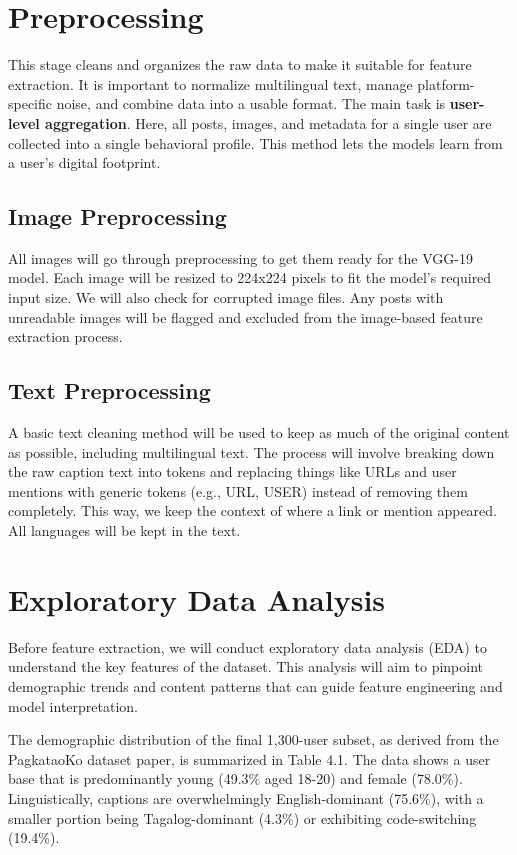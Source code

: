 \section{Preprocessing}
This stage cleans and organizes the raw data to make it suitable for feature extraction. It is important to normalize multilingual text, manage platform-specific noise, and combine data into a usable format. The main task is \textbf{user-level aggregation}. Here, all posts, images, and metadata for a single user are collected into a single behavioral profile. This method lets the models learn from a user's digital footprint.

\subsection{Image Preprocessing}
All images will go through preprocessing to get them ready for the VGG-19 model. Each image will be resized to 224x224 pixels to fit the model’s required input size. We will also check for corrupted image files. Any posts with unreadable images will be flagged and excluded from the image-based feature extraction process.  

\subsection{Text Preprocessing}
A basic text cleaning method will be used to keep as much of the original content as possible, including multilingual text. The process will involve breaking down the raw caption text into tokens and replacing things like URLs and user mentions with generic tokens (e.g., URL, USER) instead of removing them completely. This way, we keep the context of where a link or mention appeared. All languages will be kept in the text.


\section{Exploratory Data Analysis}
\label{subsec:eda}

Before feature extraction, we will conduct exploratory data analysis (EDA) to understand the key features of the dataset. This analysis will aim to pinpoint demographic trends and content patterns that can guide feature engineering and model interpretation.

The demographic distribution of the final 1,300-user subset, as derived from the PagkataoKo dataset paper, is summarized in Table 4.1. The data shows a user base that is predominantly young (49.3\% aged 18-20) and female (78.0\%). Linguistically, captions are overwhelmingly English-dominant (75.6\%), with a smaller portion being Tagalog-dominant (4.3\%) or exhibiting code-switching (19.4\%).

